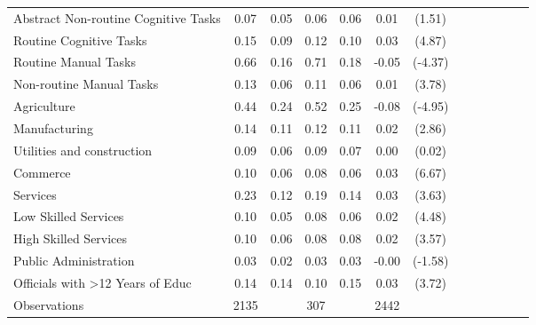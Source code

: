 {\begin{tabular}{l*{3}{cccc}}
Abstract Non-routine Cognitive Tasks&        0.07&        0.05&        0.06&        0.06&        0.01         &      (1.51)\\
Routine Cognitive Tasks&        0.15&        0.09&        0.12&        0.10&        0.03\sym{***}&      (4.87)\\
Routine Manual Tasks&        0.66&        0.16&        0.71&        0.18&       -0.05\sym{***}&     (-4.37)\\
Non-routine Manual Tasks&        0.13&        0.06&        0.11&        0.06&        0.01\sym{***}&      (3.78)\\
Agriculture         &        0.44&        0.24&        0.52&        0.25&       -0.08\sym{***}&     (-4.95)\\
Manufacturing       &        0.14&        0.11&        0.12&        0.11&        0.02\sym{**} &      (2.86)\\
Utilities and construction&        0.09&        0.06&        0.09&        0.07&        0.00         &      (0.02)\\
Commerce            &        0.10&        0.06&        0.08&        0.06&        0.03\sym{***}&      (6.67)\\
Services            &        0.23&        0.12&        0.19&        0.14&        0.03\sym{***}&      (3.63)\\
Low Skilled Services&        0.10&        0.05&        0.08&        0.06&        0.02\sym{***}&      (4.48)\\
High Skilled Services&        0.10&        0.06&        0.08&        0.08&        0.02\sym{***}&      (3.57)\\
Public Administration&        0.03&        0.02&        0.03&        0.03&       -0.00         &     (-1.58)\\
Officials with >12 Years of Educ&        0.14&        0.14&        0.10&        0.15&        0.03\sym{***}&      (3.72)\\
\hline
Observations        &        2135&            &         307&            &        2442         &            \\
\hline\hline
\end{tabular}
}

